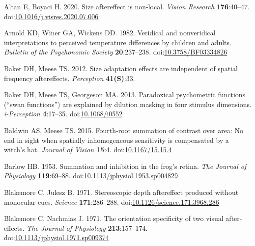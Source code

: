 \documentclass[
]{article}
\newlength{\cslhangindent}
\newlength{\cslentryspacingunit} %
\newenvironment{CSLReferences}[2] %
 {%
  \setlength{\parindent}{0pt}
  \ifodd #1
  \let\oldpar\par
  \def\par{\hangindent=\cslhangindent\oldpar}
  \fi
  \setlength{\parskip}{#2\cslentryspacingunit}
 }%
 {}
\begin{document}
\hypertarget{refs}{}
\begin{CSLReferences}{1}{0}
\leavevmode{}%
Altan E, Boyaci H. 2020. Size aftereffect is non-local. \emph{Vision Research} \textbf{176}:40--47. doi:\href{https://doi.org/10.1016/j.visres.2020.07.006}{10.1016/j.visres.2020.07.006}

\leavevmode{}%
Arnold KD, Winer GA, Wickens DD. 1982. Veridical and nonveridical interpretations to perceived temperature differences by children and adults. \emph{Bulletin of the Psychonomic Society} \textbf{20}:237--238. doi:\href{https://doi.org/10.3758/BF03334826}{10.3758/BF03334826}

\leavevmode{}%
Baker DH, Meese TS. 2012. Size adaptation effects are independent of spatial frequency aftereffects. \emph{Perception} \textbf{41(S)}:33.

\leavevmode{}%
Baker DH, Meese TS, Georgeson MA. 2013. Paradoxical psychometric functions ({``swan functions''}) are explained by dilution masking in four stimulus dimensions. \emph{i-Perception} \textbf{4}:17--35. doi:\href{https://doi.org/10.1068/i0552}{10.1068/i0552}

\leavevmode{}%
Baldwin AS, Meese TS. 2015. Fourth-root summation of contrast over area: No end in sight when spatially inhomogeneous sensitivity is compensated by a witch's hat. \emph{Journal of Vision} \textbf{15}:4. doi:\href{https://doi.org/10.1167/15.15.4}{10.1167/15.15.4}

\leavevmode{}%
Barlow HB. 1953. Summation and inhibition in the frog's retina. \emph{The Journal of Physiology} \textbf{119}:69--88. doi:\href{https://doi.org/10.1113/jphysiol.1953.sp004829}{10.1113/jphysiol.1953.sp004829}

\leavevmode{}%
Blakemore C, Julesz B. 1971. Stereoscopic depth aftereffect produced without monocular cues. \emph{Science} \textbf{171}:286--288. doi:\href{https://doi.org/10.1126/science.171.3968.286}{10.1126/science.171.3968.286}

\leavevmode{}%
Blakemore C, Nachmias J. 1971. The orientation specificity of two visual after-effects. \emph{The Journal of Physiology} \textbf{213}:157--174. doi:\href{https://doi.org/10.1113/jphysiol.1971.sp009374}{10.1113/jphysiol.1971.sp009374}


\end{CSLReferences}
\end{document}
